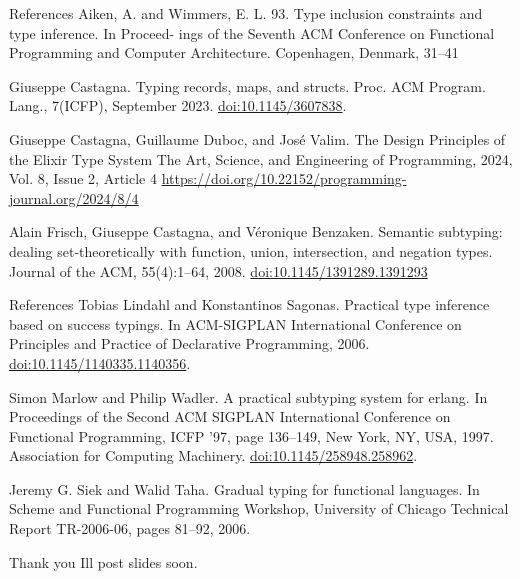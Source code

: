 \documentclass[
  ignorenonframetext,
  aspectratio=169]{beamer}
\begin{document}
\begin{frame}{References}
\label{references}
Aiken, A. and Wimmers, E. L. 93. Type inclusion constraints and type
inference. In Proceed- ings of the Seventh ACM Conference on Functional
Programming and Computer Architecture. Copenhagen, Denmark, 31--41

Giuseppe Castagna. Typing records, maps, and structs. Proc. ACM Program.
Lang., 7(ICFP), September 2023. \url{doi:10.1145/3607838}.

Giuseppe Castagna, Guillaume Duboc, and José Valim. The Design
Principles of the Elixir Type System The Art, Science, and Engineering
of Programming, 2024, Vol. 8, Issue 2, Article 4
\url{https://doi.org/10.22152/programming-journal.org/2024/8/4}

Alain Frisch, Giuseppe Castagna, and Véronique Benzaken. Semantic
subtyping: dealing set-theoretically with function, union, intersection,
and negation types. Journal of the ACM, 55(4):1--64, 2008.
\url{doi:10.1145/1391289.1391293}
\end{frame}

\begin{frame}{References}
\label{references-1}
Tobias Lindahl and Konstantinos Sagonas. Practical type inference based
on success typings. In ACM-SIGPLAN International Conference on
Principles and Practice of Declarative Programming, 2006.
\url{doi:10.1145/1140335.1140356}.

Simon Marlow and Philip Wadler. A practical subtyping system for erlang.
In Proceedings of the Second ACM SIGPLAN International Conference on
Functional Programming, ICFP '97, page 136--149, New York, NY, USA,
1997. Association for Computing Machinery.
\url{doi:10.1145/258948.258962}.

Jeremy G. Siek and Walid Taha. Gradual typing for functional languages.
In Scheme and Functional Programming Workshop, University of Chicago
Technical Report TR-2006-06, pages 81--92, 2006.
\end{frame}

\begin{frame}{Thank you}
\label{thank-you}
I\textquotesingle ll post slides soon.
\end{frame}
\end{document}
